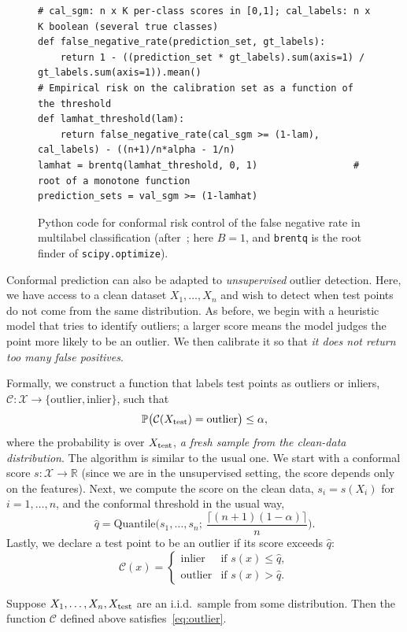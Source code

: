 \documentclass[11pt]{article}
\makeatletter
\theoremstyle{definition}
\renewcommand\subsection{\@startsection{subsection}{2}{\z@}{-3.25ex\@plus -1ex \@minus -.2ex}{1.5ex \@plus .2ex}{\normalfont\large\bfseries\color{secblue}}}
\newcommand{\C}{\mathcal{C}}
\newcommand{\X}{\mathcal{X}}
\newcommand{\qhat}{\hat{q}}
\newcommand{\Xtest}{X_{\rm test}}
\newcommand{\PP}{\mathbb{P}}
\newcommand{\R}{\mathbb{R}}
\makeatother
\begin{document}
\begin{figure}[H]
\begin{snugshade}
\begin{Verbatim}
# cal_sgm: n x K per-class scores in [0,1]; cal_labels: n x K boolean (several true classes)
def false_negative_rate(prediction_set, gt_labels):
    return 1 - ((prediction_set * gt_labels).sum(axis=1) / gt_labels.sum(axis=1)).mean()
# Empirical risk on the calibration set as a function of the threshold
def lamhat_threshold(lam):
    return false_negative_rate(cal_sgm >= (1-lam), cal_labels) - ((n+1)/n*alpha - 1/n)
lamhat = brentq(lamhat_threshold, 0, 1)                 # root of a monotone function
prediction_sets = val_sgm >= (1-lamhat)
\end{Verbatim}
\end{snugshade}
\caption{Python code for conformal risk control of the false negative rate in multilabel classification (after~\cite{gentle}; here $B=1$, and \texttt{brentq} is the root finder of \texttt{scipy.optimize}).}
\label{fig:code-crc}
\end{figure}

\subsection{Outlier Detection}\label{sec:outlier}
Conformal prediction can also be adapted to \emph{unsupervised} outlier detection. Here, we have access to a clean dataset $X_1,\dots,X_n$ and wish to detect when test points do not come from the same distribution. As before, we begin with a heuristic model that tries to identify outliers; a larger score means the model judges the point more likely to be an outlier. We then calibrate it so that \emph{it does not return too many false positives}.

Formally, we construct a function that labels test points as outliers or inliers, $\C:\X\to\{\text{outlier},\text{inlier}\}$, such that
\begin{equation}\label{eq:outlier}
\PP\big(\C(\Xtest)=\text{outlier}\big)\le\alpha,
\end{equation}
where the probability is over $\Xtest$, \emph{a fresh sample from the clean-data distribution}. The algorithm is similar to the usual one. We start with a conformal score $s:\X\to\R$ (since we are in the unsupervised setting, the score depends only on the features). Next, we compute the score on the clean data, $s_i=s(X_i)$ for $i=1,\dots,n$, and the conformal threshold in the usual way,
\[\qhat=\mathrm{Quantile}\Big(s_1,\dots,s_n;\ \frac{\lceil(n+1)(1-\alpha)\rceil}{n}\Big).\]
Lastly, we declare a test point to be an outlier if its score exceeds $\qhat$:
\[\C(x)=\begin{cases}\text{inlier}&\text{if }s(x)\le\qhat,\\ \text{outlier}&\text{if }s(x)>\qhat.\end{cases}\]
\begin{proposition}\label{prop:outlier}
Suppose $X_1,\dots,X_n,\Xtest$ are an i.i.d.\ sample from some distribution. Then the function $\C$ defined above satisfies~\eqref{eq:outlier}.
\end{proposition}
\end{document}
